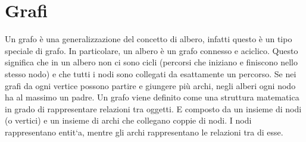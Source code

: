 \chapter{Grafi}
Un grafo è una generalizzazione del concetto di albero, infatti questo è un tipo speciale di grafo.
In particolare, un albero è un grafo connesso e aciclico. Questo significa che in un albero non
ci sono cicli (percorsi che iniziano e finiscono nello stesso nodo) e che tutti i nodi sono collegati
da esattamente un percorso. Se nei grafi da ogni vertice possono partire e giungere più archi,
negli alberi ogni nodo ha al massimo un padre. Un grafo viene definito come una struttura
matematica in grado di rappresentare relazioni tra oggetti.
E composto da un insieme di nodi
(o vertici) e un insieme di archi che collegano coppie di nodi. I nodi rappresentano entit`a,
mentre gli archi rappresentano le relazioni tra di esse.
